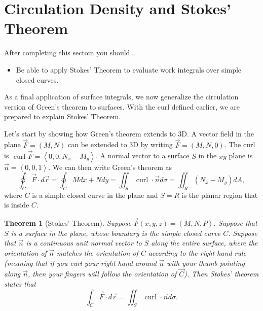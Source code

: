 \documentclass[10pt,]{book}
\theoremstyle{plain}
\newtheorem{theorem}{Theorem}[section]
\theoremstyle{definition}
\theoremstyle{definition}
\theoremstyle{definition}
\theoremstyle{definition}
\theoremstyle{definition}
\numberwithin{equation}{section}
\newcommand{\lt}{<}
\begin{document}
\typeout{************************************************}
\typeout{************************************************}
\section[{Circulation Density and Stokes' Theorem}]{Circulation Density and Stokes' Theorem}\label{section-45}
After completing this sectoin you should... \leavevmode%
\begin{itemize}[label=\textbullet]
\item{}Be able to apply Stokes' Theorem to evaluate work integrals over simple closed curves.%
\end{itemize}
%
\par
As a final application of surface integrals, we now generalize the circulation version of Green's theorem to surfaces. With the curl defined earlier, we are prepared to explain Stokes' Theorem.%
\par
Let's start by showing how Green's theorem extends to 3D. A vector field in the plane \(\vec F = \left(M,N\right)\) can be extended to 3D by writing \(\vec F = \left(M,N,0\right)\). The curl is \(\text{ curl } \vec F = \left\lt 0,0,N_x-M_y\right>\). A normal vector to a surface \(S\) in the \(xy\) plane is \(\vec n = \left\lt 0,0,1\right>\). We can then write Green's theorem as%
\begin{equation*}
\oint_C\vec F\cdot d\vec r = \oint_C Mdx+Ndy = \iint_S \text{ curl } \cdot \vec n d\sigma = \iint_R \left(N_x-M_y\right) dA,
\end{equation*}
where \(C\) is a simple closed curve in the plane and \(S=R\) is the planar region that is inside \(C\).%
\begin{theorem}[{Stokes' Theorem}]\label{theorem-14}
Suppose \(\vec F(x,y,z) = (M,N,P)\). Suppose that \(S\) is a surface in the plane, whose boundary is the simple closed curve \(C\). Suppose that \(\vec n\) is a continuous unit normal vector to \(S\) along the entire surface, where the orientation of \(\vec n\) matches the orientation of \(C\) according to the right hand rule (meaning that if you curl your right hand around \(\vec n\) with your thumb pointing along \(\vec n\), then your fingers will follow the orientation of \(\vec C\)). Then Stokes' theorem states that%
\begin{equation*}
\int_C\vec F\cdot d\vec r = \iint_S \text{ curl } \cdot \vec n d\sigma .
\end{equation*}
%
\end{theorem}
\end{document}
